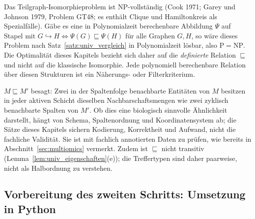 \begin{bemerkung}
	\label{bem:univ_np}
	Das Teilgraph-Isomorphieproblem ist NP-vollständig (Cook 1971; Garey und Johnson 1979, Problem GT48; es enthält Clique und Hamiltonkreis als Spezialfälle). Gäbe es eine in Polynomialzeit berechenbare Abbildung $\Psi$ auf Stapel mit $G\hookrightarrow H\iff\Psi(G)\sqsubseteq\Psi(H)$ für alle Graphen $G,H$, so wäre dieses Problem nach Satz~\ref{satz:univ_vergleich} in Polynomialzeit lösbar, also $\mathrm{P}=\mathrm{NP}$. Die Optimalität dieses Kapitels bezieht sich daher auf die \emph{definierte} Relation $\sqsubseteq$ und nicht auf die klassische Isomorphie. Jede polynomiell berechenbare Relation über diesen Strukturen ist ein Näherungs- oder Filterkriterium.
\end{bemerkung}

\begin{bemerkung}[Semantik]
	\label{bem:univ_semantik}
	$M\sqsubseteq M'$ besagt: Zwei in der Spaltenfolge benachbarte Entitäten von $M$ besitzen in jeder aktiven Schicht dieselben Nachbarschaftsmengen wie zwei zyklisch benachbarte Spalten von $M'$. Ob dies eine biologisch sinnvolle Ähnlichkeit darstellt, hängt von Schema, Spaltenordnung und Koordinatensystem ab; die Sätze dieses Kapitels sichern Kodierung, Korrektheit und Aufwand, nicht die fachliche Validität. Sie ist mit fachlich annotierten Daten zu prüfen, wie bereits in Abschnitt~\ref{sec:multiomics} vermerkt. Zudem ist $\sqsubseteq$ nicht transitiv (Lemma~\ref{lem:univ_eigenschaften}(e)); die Treffertypen sind daher paarweise, nicht als Halbordnung zu verstehen.
\end{bemerkung}

\subsection{Vorbereitung des zweiten Schritts: Umsetzung in Python}
\label{sec:univ_umsetzung}

